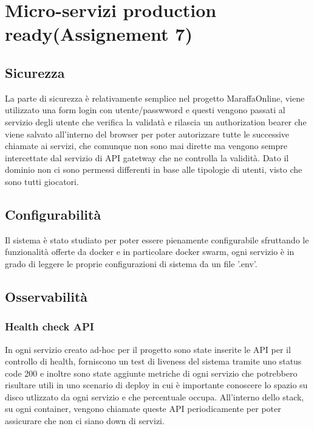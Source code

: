 \chapter{Micro-servizi production ready(Assignement 7)}
\label{ch:production_ready}

\section{Sicurezza}

La parte di sicurezza è relativamente semplice nel progetto MaraffaOnline, viene utilizzato una form login con utente/passwword e questi vengono passati al servizio degli utente che verifica la validatà e rilascia un authorization bearer che viene salvato all'interno del browser per poter autorizzare tutte le successive chiamate ai servizi, che comunque non sono mai dirette ma vengono sempre intercettate dal servizio di API gatetway che ne controlla la validità. 
Dato il dominio non ci sono permessi differenti in base alle tipologie di utenti, visto che sono tutti giocatori.

\section{Configurabilità}

Il sistema è stato studiato per poter essere pienamente configurabile sfruttando le funzionalità offerte da docker e in particolare docker swarm, ogni servizio è in grado di leggere le proprie configurazioni di sistema da un file '.env'.

\newpage
\section{Osservabilità}

\subsection{Health check API}

In ogni servizio creato ad-hoc per il progetto sono state inserite le API per il controllo di health, forniscono un test di liveness del sistema tramite uno status code 200 e inoltre sono state aggiunte metriche di ogni servizio che potrebbero risultare utili in uno scenario di deploy in cui è importante conoscere lo spazio su disco utlizzato da ogni servizio e che percentuale occupa. 
All'interno dello stack, su ogni container, vengono chiamate queste API periodicamente per poter assicurare che non ci siano down di servizi.

